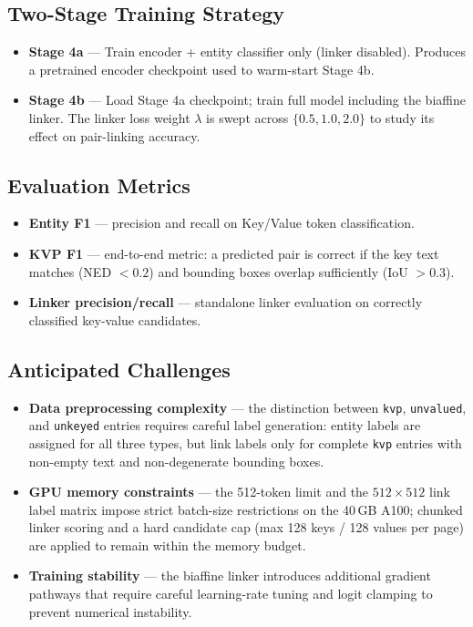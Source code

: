 \documentclass[11pt,a4paper]{article}
\begin{document}
\subsection*{Two-Stage Training Strategy}
\begin{itemize}[noitemsep]
  \item \textbf{Stage 4a} --- Train encoder + entity classifier only
        (linker disabled). Produces a pretrained encoder checkpoint
        used to warm-start Stage 4b.
  \item \textbf{Stage 4b} --- Load Stage 4a checkpoint; train full model
        including the biaffine linker. The linker loss weight $\lambda$
        is swept across $\{0.5, 1.0, 2.0\}$ to study its effect on
        pair-linking accuracy.
\end{itemize}

\subsection*{Evaluation Metrics}
\begin{itemize}[noitemsep]
  \item \textbf{Entity F1} --- precision and recall on Key/Value token
        classification.
  \item \textbf{KVP F1} --- end-to-end metric: a predicted pair is correct
        if the key text matches (NED $< 0.2$) and bounding boxes overlap
        sufficiently (IoU $> 0.3$).
  \item \textbf{Linker precision/recall} --- standalone linker evaluation
        on correctly classified key-value candidates.
\end{itemize}

\subsection*{Anticipated Challenges}
\begin{itemize}[noitemsep]
  \item \textbf{Data preprocessing complexity} --- the distinction between
        \texttt{kvp}, \texttt{unvalued}, and \texttt{unkeyed} entries
        requires careful label generation: entity labels are assigned for
        all three types, but link labels only for complete \texttt{kvp}
        entries with non-empty text and non-degenerate bounding boxes.
  \item \textbf{GPU memory constraints} --- the 512-token limit and the
        $512 \times 512$ link label matrix impose strict batch-size
        restrictions on the 40\,GB A100; chunked linker scoring and
        a hard candidate cap (max 128 keys / 128 values per page) are
        applied to remain within the memory budget.
  \item \textbf{Training stability} --- the biaffine linker introduces
        additional gradient pathways that require careful learning-rate
        tuning and logit clamping to prevent numerical instability.
\end{itemize}
\end{document}
